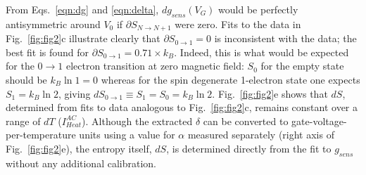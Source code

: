 \documentclass[twocolumn,showpacs,preprintnumbers,amsmath,amssymb,pra,aps,superscriptaddress]{revtex4-1}
\begin{document}
From Eqs.~\ref{eqn:dg} and \ref{eqn:delta}, $dg_{sens}(V_G)$ would be perfectly antisymmetric around $V_0$ if $\partial S_{N\rightarrow N+1}$ were zero.  Fits to the data in Fig.~\ref{fig:fig2}c illustrate clearly that $\partial S_{0\rightarrow 1}=0$ is inconsistent with the data;  the best fit is found for $\partial S_{0\rightarrow 1}=0.71\times k_B$.  Indeed, this is what would be expected for the $0 \rightarrow 1$ electron transition at zero magnetic field: $S_0$ for the empty state should be $k_B \ln{1}=0$ whereas for the spin degenerate 1-electron state one expects $S_1=k_B\ln{2}$, giving $dS_{0\rightarrow 1}\equiv S_1 = S_0 =k_B\ln{2}$. Fig.~\ref{fig:fig2}e shows that $dS$,  determined from fits to data analogous to Fig.~\ref{fig:fig2}c, remains constant over a range of $dT$ ($I^{AC}_{Heat}$).  Although the extracted $\delta$ can be converted to gate-voltage-per-temperature units using a value for $\alpha$ measured separately (right axis of Fig.~\ref{fig:fig2}e), the entropy itself, $dS$, is determined directly from the fit to $g_{sens}$ without any additional calibration.
\end{document}
